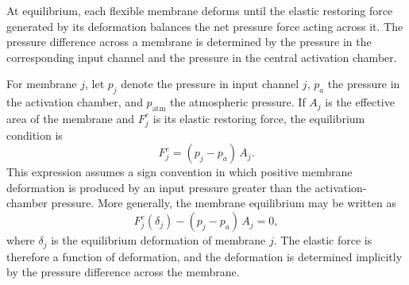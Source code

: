 \documentclass[11pt,a4paper]{article}
\numberwithin{equation}{section}
\newcommand{\patm}{p_{\mathrm{atm}}}
\begin{document}
At equilibrium, each flexible membrane deforms until the elastic restoring force generated by its deformation
balances the net pressure force acting across it. The pressure difference across a membrane is determined by the
pressure in the corresponding input channel and the pressure in the central activation chamber.

For membrane $j$, let $p_j$ denote the pressure in input channel $j$, $p_a$ the pressure in the activation chamber,
and $\patm$ the atmospheric pressure. If $A_j$ is the effective area of the membrane and $F_j^{e}$ is its elastic
restoring force, the equilibrium condition is
\begin{equation}
  F_j^{e} = (p_j - p_a)\,A_j .
  \label{eq:membrane-equilibrium}
\end{equation}
This expression assumes a sign convention in which positive membrane deformation is produced by an input pressure
greater than the activation-chamber pressure. More generally, the membrane equilibrium may be written as
\begin{equation}
  F_j^{e}(\delta_j) - (p_j - p_a)\,A_j = 0,
  \label{eq:membrane-equilibrium-general}
\end{equation}
where $\delta_j$ is the equilibrium deformation of membrane $j$. The elastic force is therefore a function of
deformation, and the deformation is determined implicitly by the pressure difference across the membrane.
\end{document}
